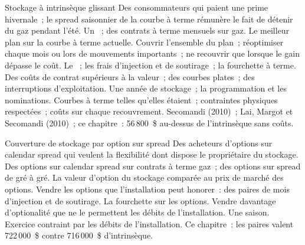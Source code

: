 \begin{strategyfile}{Stockage à intrinsèque glissant}\label{strat:s2:storage-transport-and-physical-optionality:rolling}
 Des consommateurs qui paient une prime hivernale~; le spread saisonnier de la courbe à terme rémunère le fait de détenir du gaz pendant l'été.
 Un ~; des contrats à terme mensuels sur gaz.
 Le meilleur plan sur la courbe à terme actuelle.
 Couvrir l'ensemble du plan~; réoptimiser chaque mois ou lors de mouvements importants~; ne recouvrir que lorsque le gain dépasse le coût.
 Le ~; les frais d'injection et de soutirage~; la fourchette à terme.
 Des coûts de contrat supérieurs à la valeur~; des courbes plates~; des interruptions d'exploitation.
 Une année de stockage~; la programmation et les nominations.
 Courbes à terme telles qu'elles étaient~; contraintes physiques respectées~; coûts sur chaque recouvrement.
 Secomandi (2010)~; Lai, Margot et Secomandi (2010)~; ce chapitre~: 56\,800~\$ au-dessus de l'intrinsèque sans coûts.
\end{strategyfile}

\begin{strategyfile}{Couverture de stockage par option sur spread}\label{strat:s2:storage-transport-and-physical-optionality:options}
 Des acheteurs d'options sur calendar spread qui veulent la flexibilité dont dispose le propriétaire du stockage.
 Des options sur calendar spread sur contrats à terme gaz~; des options sur spread de gré à gré.
 La valeur d'option du stockage comparée au prix de marché des options.
 Vendre les options que l'installation peut honorer~: des paires de mois d'injection et de soutirage.
 La fourchette sur les options.
 Vendre davantage d'optionalité que ne le permettent les débits de l'installation.
 Une saison.
 Exercice contraint par les débits de l'installation.
 Ce chapitre~: les paires valent 722\,000~\$ contre 716\,000~\$ d'intrinsèque.
\end{strategyfile}

